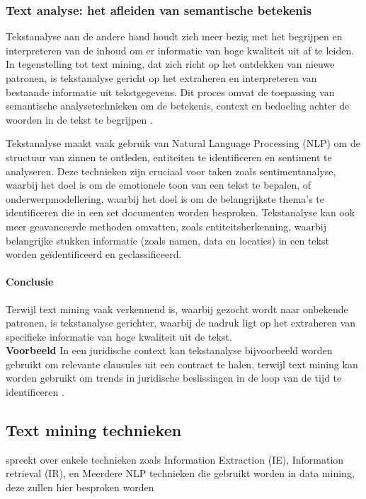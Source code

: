 \subsubsection{Text analyse: het afleiden van semantische betekenis}
Tekstanalyse aan de andere hand houdt zich meer bezig met het begrijpen en interpreteren van de inhoud om er informatie van hoge kwaliteit uit af te leiden. In tegenstelling tot text mining, dat zich richt op het ontdekken van nieuwe patronen, is tekstanalyse gericht op het extraheren en interpreteren van bestaande informatie uit tekstgegevens. Dit proces omvat de toepassing van semantische analysetechnieken om de betekenis, context en bedoeling achter de woorden in de tekst te begrijpen \autocite{gaikwad2014text}.

Tekstanalyse maakt vaak gebruik van Natural Language Processing (NLP) om de structuur van zinnen te ontleden, entiteiten te identificeren en sentiment te analyseren. Deze technieken zijn cruciaal voor taken zoals sentimentanalyse, waarbij het doel is om de emotionele toon van een tekst te bepalen, of onderwerpmodellering, waarbij het doel is om de belangrijkste thema's te identificeren die in een set documenten worden besproken. Tekstanalyse kan ook meer geavanceerde methoden omvatten, zoals entiteitsherkenning, waarbij belangrijke stukken informatie (zoals namen, data en locaties) in een tekst worden geïdentificeerd en geclassificeerd.

\paragraph{Conclusie}
Terwijl text mining vaak verkennend is, waarbij gezocht wordt naar onbekende patronen, is tekstanalyse gerichter, waarbij de nadruk ligt op het extraheren van specifieke informatie van hoge kwaliteit uit de tekst. \\
\textbf{Voorbeeld} In een juridische context kan tekstanalyse bijvoorbeeld worden gebruikt om relevante clausules uit een contract te halen, terwijl text mining kan worden gebruikt om trends in juridische beslissingen in de loop van de tijd te identificeren \autocite{gaikwad2014text}.

\subsection{Text mining technieken}
\autocite{Talib2016TextMining} spreekt over enkele technieken zoals Information Extraction (IE), Information retrieval (IR), en Meerdere NLP technieken die gebruikt worden in data mining, deze zullen hier besproken worden

